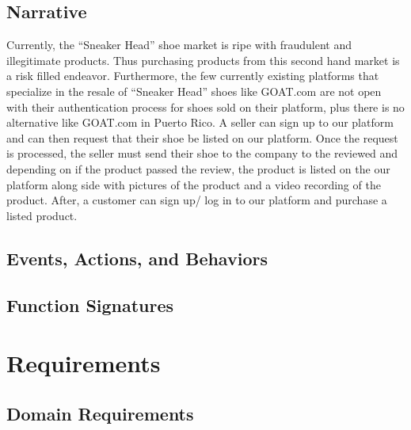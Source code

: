 \subsection{Narrative}
\hspace{1cm} Currently, the ``Sneaker Head'' shoe market is ripe with fraudulent and illegitimate products. Thus purchasing products from this second hand market is a risk filled endeavor. Furthermore, the few currently existing platforms that specialize in the resale of ``Sneaker Head'' shoes like GOAT.com are not open with their authentication process for shoes sold on their platform, plus there is no alternative like GOAT.com in Puerto Rico. A seller can sign up to our platform and can then request that their shoe be listed on our platform. Once the request is processed, the seller must send their shoe to the company to the reviewed and depending on if the product passed the review, the product is listed on the our platform along side with pictures of the product and a video recording of the product. After, a customer can sign up/ log in to our platform and purchase a listed product.
\subsection{Events, Actions, and Behaviors}
\subsection{Function Signatures}
\newpage
\section{Requirements}
\subsection{Domain Requirements}
